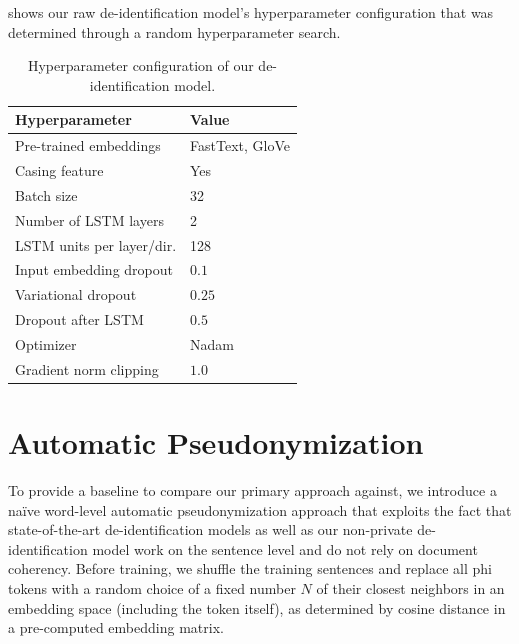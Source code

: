 %
 shows our raw de-identification model's hyperparameter configuration that was determined through a random hyperparameter search.

\begin{table}
    \centering
    \begin{tabular}{ll}
     \toprule
     Hyperparameter & Value\\
     \midrule
     Pre-trained embeddings & FastText, GloVe\\
     Casing feature & Yes\\
     Batch size & 32\\
     Number of LSTM layers & 2\\
     LSTM units per layer/dir. & 128\\
     Input embedding dropout & $0.1$\\
     Variational dropout & $0.25$\\
     Dropout after LSTM & $0.5$\\
     Optimizer & Nadam\\
     Gradient norm clipping & $1.0$\\
     \bottomrule
    \end{tabular}
    \caption{Hyperparameter configuration of our de-identification model.}\label{tab:deid-hyperparameters}
\end{table}


\section{Automatic Pseudonymization}\label{sec:automatic-pseudonymization}
%
To provide a baseline to compare our primary approach against, we introduce a naïve word-level automatic pseudonymization approach that exploits the fact that state-of-the-art de-identification models \citep{liu2017identification,dernoncourt2017identification} as well as our non-private de-identification model work on the sentence level and do not rely on document coherency.
%
Before training, we shuffle the training sentences and replace all \ac{phi} tokens with a random choice of a fixed number $N$ of their closest neighbors in an embedding space (including the token itself), as determined by cosine distance in a pre-computed embedding matrix.

